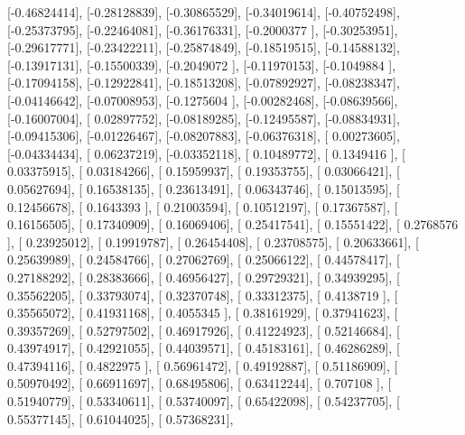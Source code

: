 \documentclass{article}
\begin{document}
       [-0.46824414],
       [-0.28128839],
       [-0.30865529],
       [-0.34019614],
       [-0.40752498],
       [-0.25373795],
       [-0.22464081],
       [-0.36176331],
       [-0.2000377 ],
       [-0.30253951],
       [-0.29617771],
       [-0.23422211],
       [-0.25874849],
       [-0.18519515],
       [-0.14588132],
       [-0.13917131],
       [-0.15500339],
       [-0.2049072 ],
       [-0.11970153],
       [-0.1049884 ],
       [-0.17094158],
       [-0.12922841],
       [-0.18513208],
       [-0.07892927],
       [-0.08238347],
       [-0.04146642],
       [-0.07008953],
       [-0.1275604 ],
       [-0.00282468],
       [-0.08639566],
       [-0.16007004],
       [ 0.02897752],
       [-0.08189285],
       [-0.12495587],
       [-0.08834931],
       [-0.09415306],
       [-0.01226467],
       [-0.08207883],
       [-0.06376318],
       [ 0.00273605],
       [-0.04334434],
       [ 0.06237219],
       [-0.03352118],
       [ 0.10489772],
       [ 0.1349416 ],
       [ 0.03375915],
       [ 0.03184266],
       [ 0.15959937],
       [ 0.19353755],
       [ 0.03066421],
       [ 0.05627694],
       [ 0.16538135],
       [ 0.23613491],
       [ 0.06343746],
       [ 0.15013595],
       [ 0.12456678],
       [ 0.1643393 ],
       [ 0.21003594],
       [ 0.10512197],
       [ 0.17367587],
       [ 0.16156505],
       [ 0.17340909],
       [ 0.16069406],
       [ 0.25417541],
       [ 0.15551422],
       [ 0.2768576 ],
       [ 0.23925012],
       [ 0.19919787],
       [ 0.26454408],
       [ 0.23708575],
       [ 0.20633661],
       [ 0.25639989],
       [ 0.24584766],
       [ 0.27062769],
       [ 0.25066122],
       [ 0.44578417],
       [ 0.27188292],
       [ 0.28383666],
       [ 0.46956427],
       [ 0.29729321],
       [ 0.34939295],
       [ 0.35562205],
       [ 0.33793074],
       [ 0.32370748],
       [ 0.33312375],
       [ 0.4138719 ],
       [ 0.35565072],
       [ 0.41931168],
       [ 0.4055345 ],
       [ 0.38161929],
       [ 0.37941623],
       [ 0.39357269],
       [ 0.52797502],
       [ 0.46917926],
       [ 0.41224923],
       [ 0.52146684],
       [ 0.43974917],
       [ 0.42921055],
       [ 0.44039571],
       [ 0.45183161],
       [ 0.46286289],
       [ 0.47394116],
       [ 0.4822975 ],
       [ 0.56961472],
       [ 0.49192887],
       [ 0.51186909],
       [ 0.50970492],
       [ 0.66911697],
       [ 0.68495806],
       [ 0.63412244],
       [ 0.707108  ],
       [ 0.51940779],
       [ 0.53340611],
       [ 0.53740097],
       [ 0.65422098],
       [ 0.54237705],
       [ 0.55377145],
       [ 0.61044025],
       [ 0.57368231],
\end{document}
